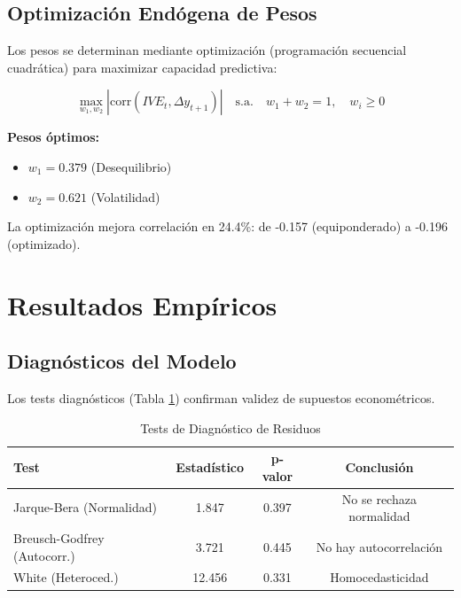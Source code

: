 \documentclass[3p,11pt]{elsarticle}
\begin{document}
\subsection{Optimización Endógena de Pesos}

Los pesos se determinan mediante optimización (programación secuencial cuadrática) para maximizar capacidad predictiva:

\begin{equation}
\max_{w_1,w_2} |\text{corr}(IVE_t, \Delta y_{t+1})| \quad \text{s.a.} \quad w_1 + w_2 = 1, \quad w_i \geq 0
\end{equation}

\textbf{Pesos óptimos:}
\begin{itemize}
    \item $w_1 = 0.379$ (Desequilibrio)
    \item $w_2 = 0.621$ (Volatilidad)
\end{itemize}

La optimización mejora correlación en 24.4\%: de -0.157 (equiponderado) a -0.196 (optimizado).

\section{Resultados Empíricos}

\subsection{Diagnósticos del Modelo}

Los tests diagnósticos (Tabla \ref{tab:diagnosticos}) confirman validez de supuestos econométricos.

\begin{table}[htbp]
\centering
\caption{Tests de Diagnóstico de Residuos}
\label{tab:diagnosticos}
\vspace{5pt}
\footnotesize
\begin{tabular}{@{}lccc@{}}
\toprule
\textbf{Test} & \textbf{Estadístico} & \textbf{p-valor} & \textbf{Conclusión} \\
\midrule
Jarque-Bera (Normalidad) & 1.847 & 0.397 & No se rechaza normalidad \\[2pt]
Breusch-Godfrey (Autocorr.) & 3.721 & 0.445 & No hay autocorrelación \\[2pt]
White (Heteroced.) & 12.456 & 0.331 & Homocedasticidad \\
\bottomrule
\end{tabular}
\end{table}
\end{document}

